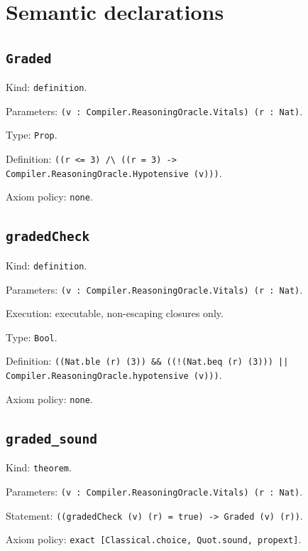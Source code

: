 \documentclass[11pt]{article}
\begin{document}
\section*{Semantic declarations}
\subsection*{\texttt{Graded}}
\noindent Kind: \texttt{definition}.\par
\noindent Parameters: \texttt{(v : Compiler.ReasoningOracle.Vitals) (r : Nat)}.\par
\noindent Type: \texttt{Prop}.\par
\noindent Definition: \texttt{((r <= 3) /\textbackslash{} ((r = 3) -> Compiler.ReasoningOracle.Hypotensive (v)))}.\par
\noindent Axiom policy: \texttt{none}.\par
\subsection*{\texttt{gradedCheck}}
\noindent Kind: \texttt{definition}.\par
\noindent Parameters: \texttt{(v : Compiler.ReasoningOracle.Vitals) (r : Nat)}.\par
\noindent Execution: executable, non-escaping closures only.\par
\noindent Type: \texttt{Bool}.\par
\noindent Definition: \texttt{((Nat.ble (r) (3)) \&\& ((!(Nat.beq (r) (3))) || Compiler.ReasoningOracle.hypotensive (v)))}.\par
\noindent Axiom policy: \texttt{none}.\par
\subsection*{\texttt{graded\_sound}}
\noindent Kind: \texttt{theorem}.\par
\noindent Parameters: \texttt{(v : Compiler.ReasoningOracle.Vitals) (r : Nat)}.\par
\noindent Statement: \texttt{((gradedCheck (v) (r) = true) -> Graded (v) (r))}.\par
\noindent Axiom policy: \texttt{exact [Classical.choice, Quot.sound, propext]}.\par
\end{document}
